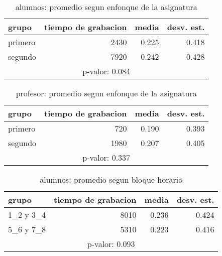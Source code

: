 \documentclass[spanish]{article}
\begin{document}
\begin{table}[h!]
\begin{center}
\begin{tabular}{|l|r|r|r|}
\hline
grupo   & tiempo de grabacion & media          & desv. est.    \\ \hline
primero &                2430 &          0.225 &          0.418\\ \hline
segundo &                7920 &          0.242 &          0.428\\ \hline
\multicolumn{4}{|c|}{p-valor: 0.084} \\ \hline
\end{tabular}
\caption{alumnos: promedio segun enfonque de la asignatura}
\end{center}
\end{table}

\begin{table}[h!]
\begin{center}
\begin{tabular}{|l|r|r|r|}
\hline
grupo   & tiempo de grabacion & media          & desv. est.    \\ \hline
primero &                 720 &          0.190 &          0.393\\ \hline
segundo &                1980 &          0.207 &          0.405\\ \hline
\multicolumn{4}{|c|}{p-valor: 0.337} \\ \hline
\end{tabular}
\caption{profesor: promedio segun enfonque de la asignatura}
\end{center}
\end{table}

\begin{table}[h!]
\begin{center}
\begin{tabular}{|l|r|r|r|}
\hline
grupo     & tiempo de grabacion & media          & desv. est.    \\ \hline
1\_2 y 3\_4 &                8010 &          0.236 &          0.424\\ \hline
5\_6 y 7\_8 &                5310 &          0.223 &          0.416\\ \hline
\multicolumn{4}{|c|}{p-valor: 0.093} \\ \hline
\end{tabular}
\caption{alumnos: promedio segun bloque horario}
\end{center}
\end{table}
\end{document}
